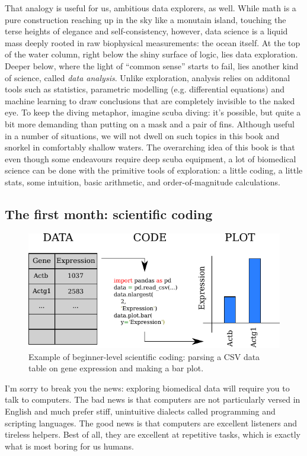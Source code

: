 \documentclass[12pt,a4paper,notitlepage,onecolumn]{article}
\begin{document}
That analogy is useful for us, ambitious data explorers, as well. While math is a pure construction reaching up in the sky like a monutain island, touching the terse heights of elegance and self-consistency, however, data science is a liquid mass deeply rooted in raw biophysical measurements: the ocean itself. At the top of the water column, right below the shiny surface of logic, lies data exploration. Deeper below, where the light of ``common sense'' starts to fail, lies another kind of science, called \textit{data analysis}. Unlike exploration, analysis relies on additonal tools such as statistics, parametric modelling (e.g. differential equations) and machine learning to draw conclusions that are completely invisible to the naked eye. To keep the diving metaphor, imagine scuba diving: it's possible, but quite a bit more demanding than putting on a mask and a pair of fins. Although useful in a number of situations, we will not dwell on such topics in this book and snorkel in comfortably shallow waters. The overarching idea of this book is that even though some endeavours require deep scuba equipment, a lot of biomedical science can be done with the primitive tools of exploration: a little coding, a little stats, some intuition, basic arithmetic, and order-of-magnitude calculations.

\subsection{The first month: scientific coding} \label{ssec:firstmonth}

\begin{figure}[h]
\begin{center}
\includegraphics[width=0.8\linewidth]{parsing_csv.pdf}
\caption{Example of beginner-level scientific coding: parsing a CSV data table on gene expression and making a bar plot.}
\label{fig:parsecsv}
\end{center}
\end{figure}

I'm sorry to break you the news: exploring biomedical data will require you to talk to computers. The bad news is that computers are not particularly versed in English and much prefer stiff, unintuitive dialects called programming and scripting languages. The good news is that computers are excellent listeners and tireless helpers. Best of all, they are excellent at repetitive tasks, which is exactly what is most boring for us humans.
\end{document}
